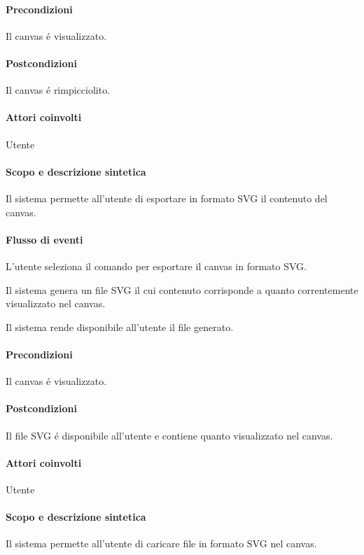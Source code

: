 \paragraph{Precondizioni} Il canvas \'e visualizzato.
\paragraph{Postcondizioni} Il canvas \'e rimpicciolito.

\paragraph{Attori coinvolti} Utente
\paragraph{Scopo e descrizione sintetica} 
Il sistema permette all'utente di esportare in formato SVG il contenuto del canvas.
\paragraph{Flusso di eventi}
\begin{elenconumerato}[\textbf{}]{\subsubsecindent}
\item L'utente seleziona il comando per esportare il canvas in formato SVG.
\item Il sistema genera un file SVG il cui contenuto corrisponde a quanto correntemente visualizzato nel canvas.
\item Il sistema rende disponibile all'utente il file generato.
\end{elenconumerato}
\paragraph{Precondizioni} Il canvas \'e visualizzato.
\paragraph{Postcondizioni} Il file SVG \'e disponibile all'utente e contiene quanto visualizzato nel canvas.

\paragraph{Attori coinvolti} Utente
\paragraph{Scopo e descrizione sintetica} 
Il sistema permette all'utente di caricare file in formato SVG nel canvas.
